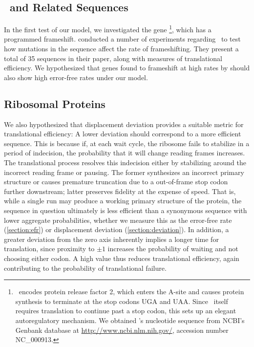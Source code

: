 \documentclass[twocolumn]{article}
\begin{document}
\subsection{\prfB\ and Related Sequences}
In the first test of our model, we investigated the gene
\prfB\footnote{
  \prfB\ encodes protein release factor 2, which enters
  the A-site and causes protein synthesis to terminate at the stop
  codons \textsc{UGA} and \textsc{UAA}. Since \prfB\ itself requires 
  translation to continue past a stop codon, this sets up an elegant 
  autoregulatory mechanism. We obtained \prfB's nucleotide sequence from
  NCBI's Genbank database at \url{http://www.ncbi.nlm.nih.gov/}, accession
  number NC\_000913.
}, which has a programmed frameshift.
\citet{weiss87} conducted a number of experiments regarding
\prfB\ to test how mutations in the sequence affect the rate of
frameshifting.  They present a total of 35 sequences in their paper,
along with measures of translational efficiency.  We hypothesized that
genes found to frameshift at high rates by
\citeauthor{weiss87} should also show high error-free rates under
our model.

\subsection{Ribosomal \mbox{Proteins}}
We also hypothesized that displacement deviation
provides a suitable metric for translational efficiency: A lower
deviation should correspond to a more efficient sequence.
This is because if, at each wait cycle, the
ribosome fails to stabilize in a period of indecision, the probability
that it will change reading frames increases. The translational
process resolves this indecision either by stabilizing around the
incorrect reading frame or pausing. The former synthesizes an
incorrect primary structure or causes premature truncation due to a
out-of-frame stop codon further downstream; latter preserves fidelity at the
expense of speed. That is, while a single run may produce
a working primary structure of the protein, the sequence in question
ultimately is less efficient than a synonymous sequence with lower
aggregate probabilities, whether we measure this as the
error-free rate (\autoref{section:efr}) or displacement deviation
(\autoref{section:deviation}). In addition, a greater deviation from
the zero axis inherently implies a longer time for translation, 
since proximity to $\pm1$ increases the probability of waiting and not choosing
either codon. A high value thus reduces translational
efficiency, again contributing to the probability of
translational failure.
\end{document}
